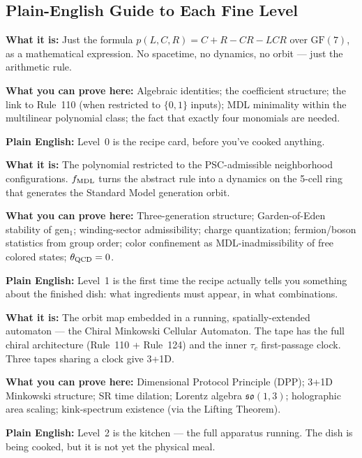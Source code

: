 \documentclass[11pt,a4paper]{article}
\newcommand{\poly}{p}
\newcommand{\fMDL}{f_{\rm MDL}}
\begin{document}
\subsection{Plain-English Guide to Each Fine Level}

\begin{tcolorbox}[colback=levzero,colframe=orange!50!black,
  title=Level 0 --- The Raw Polynomial]
\textbf{What it is:} Just the formula $\poly(L,C,R) = C + R - CR - LCR$
over $\mathrm{GF}(7)$, as a mathematical expression.
No spacetime, no dynamics, no orbit --- just the arithmetic rule.

\medskip\noindent
\textbf{What you can prove here:}
Algebraic identities; the coefficient structure; the link to Rule~110
(when restricted to $\{0,1\}$ inputs); MDL minimality within the
multilinear polynomial class; the fact that exactly four monomials are
needed.

\medskip\noindent
\textbf{Plain English:}
Level~0 is the recipe card, before you've cooked anything.
\end{tcolorbox}

\begin{tcolorbox}[colback=levone,colframe=blue!50!black,
  title=Level 1 --- The PSC-Projected Orbit Map ($f_{\rm MDL}$)]
\textbf{What it is:} The polynomial restricted to the PSC-admissible
neighborhood configurations.
$\fMDL$ turns the abstract rule into a dynamics on the 5-cell ring that
generates the Standard Model generation orbit.

\medskip\noindent
\textbf{What you can prove here:}
Three-generation structure; Garden-of-Eden stability of gen$_1$;
winding-sector admissibility; charge quantization;
fermion/boson statistics from group order;
color confinement as MDL-inadmissibility of free colored states;
$\theta_{\rm QCD} = 0$.

\medskip\noindent
\textbf{Plain English:}
Level~1 is the first time the recipe actually tells you something about
the finished dish: what ingredients must appear, in what combinations.
\end{tcolorbox}

\begin{tcolorbox}[colback=levtwo,colframe=green!50!black,
  title=Level 2 --- The CMCA Tape]
\textbf{What it is:} The orbit map embedded in a running, spatially-extended
automaton --- the Chiral Minkowski Cellular Automaton.
The tape has the full chiral architecture (Rule~110 + Rule~124) and the
inner $\tau_c$ first-passage clock.
Three tapes sharing a clock give 3+1D.

\medskip\noindent
\textbf{What you can prove here:}
Dimensional Protocol Principle (DPP); 3+1D Minkowski structure;
SR time dilation; Lorentz algebra $\mathfrak{so}(1,3)$;
holographic area scaling;
kink-spectrum existence (via the Lifting Theorem).

\medskip\noindent
\textbf{Plain English:}
Level~2 is the kitchen --- the full apparatus running.
The dish is being cooked, but it is not yet the physical meal.
\end{tcolorbox}
\end{document}

